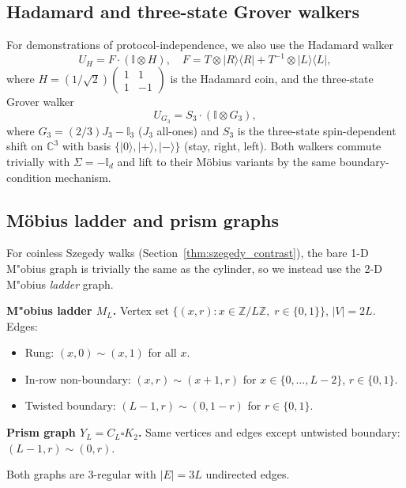 \documentclass[aps,pra,reprint,amsmath,amssymb,superscriptaddress,nofootinbib,longbibliography]{revtex4-2}
\newcommand{\Z}{\mathbb{Z}}
\newcommand{\C}{\mathbb{C}}
\newcommand{\I}{\mathbb{I}}
\newcommand{\bra}[1]{\langle #1 |}
\newcommand{\ket}[1]{| #1 \rangle}
\begin{document}
\subsection{Hadamard and three-state Grover walkers}

For demonstrations of protocol-independence, we also use the Hadamard walker
\begin{equation}
U_H = F \cdot (\I \otimes H),\quad F = T \otimes \ket{R}\bra{R} + T^{-1} \otimes \ket{L}\bra{L},
\end{equation}
where $H = (1/\sqrt{2})\begin{pmatrix} 1 & 1 \\ 1 & -1 \end{pmatrix}$ is the Hadamard coin, and the three-state Grover walker
\begin{equation}
U_{G_3} = S_3 \cdot (\I \otimes G_3),
\end{equation}
where $G_3 = (2/3) J_3 - \I_3$ ($J_3$ all-ones) and $S_3$ is the three-state spin-dependent shift on $\C^3$ with basis $\{\ket{0}, \ket{+}, \ket{-}\}$ (stay, right, left). Both walkers commute trivially with $\Sigma = -\I_d$ and lift to their M\"obius variants by the same boundary-condition mechanism.

\subsection{M\"obius ladder and prism graphs}
\label{sec:ladder}

For coinless Szegedy walks (Section~\ref{thm:szegedy_contrast}), the bare 1-D M"obius graph is trivially the same as the cylinder, so we instead use the 2-D M"obius \emph{ladder} graph.

\textbf{M"obius ladder $M_L$.} Vertex set $\{(x, r) : x \in \Z/L\Z,\; r \in \{0, 1\}\}$, $|V| = 2L$. Edges:
\begin{itemize}
\item Rung: $(x, 0) \sim (x, 1)$ for all $x$.
\item In-row non-boundary: $(x, r) \sim (x+1, r)$ for $x \in \{0, \dots, L-2\}$, $r \in \{0, 1\}$.
\item Twisted boundary: $(L-1, r) \sim (0, 1-r)$ for $r \in \{0, 1\}$.
\end{itemize}

\textbf{Prism graph $Y_L = C_L \square K_2$.} Same vertices and edges except untwisted boundary: $(L-1, r) \sim (0, r)$.

Both graphs are 3-regular with $|E| = 3L$ undirected edges.
\end{document}

